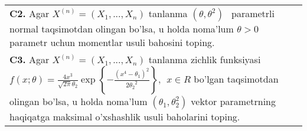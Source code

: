 \documentclass{article}
\begin{document}
\begin{tabular}{m{17cm}}
\\
\textbf{C2.} 
Agar \(X^{(n)} = \left( X_{1},...,X_{n} \right)\) tanlanma \((\theta,\theta^{2})\ \ \) parametrli normal taqsimotdan olingan bo'lsa, u holda noma'lum \(\theta > 0\) parametr uchun momentlar usuli bahosini toping.
\\
\textbf{C3.} 
Agar \(X^{(n)} = \left( X_{1},...,X_{n} \right)\) tanlanma zichlik funksiyasi\(f(x;\theta) = \frac{4x^{3}}{\sqrt{2\pi}\theta_{2}}\exp\left\{ - \frac{\left( x^{4} - \theta_{1} \right)^{2}}{2{\theta_{2}}^{2}} \right\},\ \ x \in R\) bo'lgan taqsimotdan olingan bo'lsa, u holda noma'lum \(\left( \theta_{1},\theta_{2}^{2} \right)\) vektor parametrning haqiqatga maksimal o'xshashlik usuli baholarini toping.
\\

\end{tabular}
\vspace{1cm}
\end{document}
